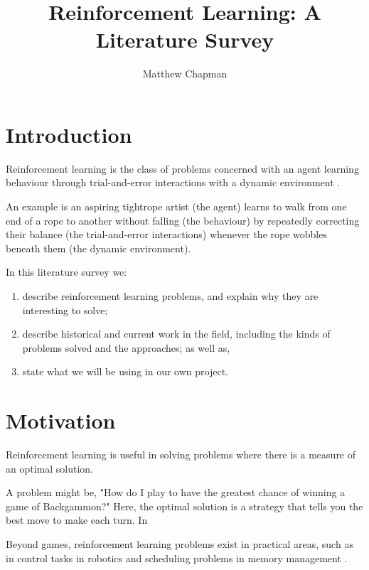 \documentclass{article}
\title{Reinforcement Learning: A Literature Survey}
\author{Matthew Chapman}
\begin{document}
\maketitle

\begin{abstract}
  
\end{abstract}

\section{Introduction}

Reinforcement learning is the class of problems concerned with an agent
learning behaviour through trial-and-error interactions with a dynamic
environment \cite{Kaelbling1996}.

An example is an aspiring tightrope artist (the agent) learns to walk
from one end of a rope to another without falling (the behaviour) by
repeatedly correcting their balance (the trial-and-error interactions)
whenever the rope wobbles beneath them (the dynamic environment).

In this literature survey we: 

\begin{enumerate}
  \item{describe reinforcement learning problems, and explain why they are interesting to solve;} 
  \item{describe historical and current work in the field, including the kinds of problems solved and the approaches; as well as,} 
  \item{state what we will be using in our own project.}
\end{enumerate}

\section{Motivation}

Reinforcement learning is useful in solving problems where there is a
measure of an optimal solution.

A problem might be, "How do I play to have the greatest chance of winning a game of Backgammon?"
Here, the optimal solution is a strategy that tells you the best move to make each turn. In \cite{}

Beyond games, reinforcement learning problems exist in practical areas,
such as in control tasks in robotics \cite{Kober2013} and scheduling problems in
memory management \cite{Ipek2008}.
\end{document}
